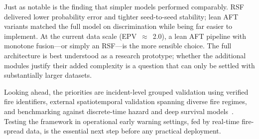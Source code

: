 \documentclass[fire,article,submit,pdftex]{../Definitions/mdpi}
\begin{document}
Just as notable is the finding that simpler models performed comparably. RSF delivered lower probability error and tighter seed-to-seed stability; lean AFT variants matched the full model on discrimination while being far easier to implement. At the current data scale (EPV~$\approx$~2.0), a lean AFT pipeline with monotone fusion---or simply an RSF---is the more sensible choice. The full architecture is best understood as a research prototype; whether the additional modules justify their added complexity is a question that can only be settled with substantially larger datasets.

Looking ahead, the priorities are incident-level grouped validation using verified fire identifiers, external spatiotemporal validation spanning diverse fire regimes, and benchmarking against discrete-time hazard and deep survival models~\cite{Katzman2018}. Testing the framework in operational early warning settings, fed by real-time fire-spread data, is the essential next step before any practical deployment.

\vspace{6pt}
\end{document}
